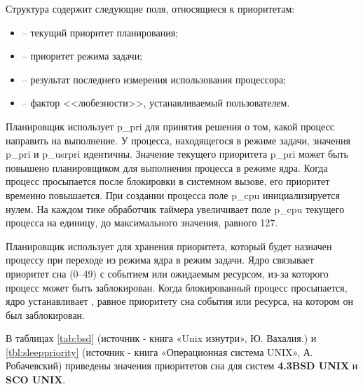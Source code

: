 Структура  содержит следующие поля, относящиеся к приоритетам:
\begin{itemize}
	\item {} -- текущий приоритет планирования;
	\item {} -- приоритет режима задачи;
	\item {} -- результат последнего измерения использования процессора;
	\item {} -- фактор <<любезности>>, устанавливаемый пользователем.
\end{itemize}

Планировщик использует p\_pri для принятия решения о том, какой процесс направить на выполнение. У процесса, находящегося в режиме задачи, значения p\_pri и p\_usrpri идентичны. Значение текущего приоритета p\_pri может быть повышено планировщиком для выполнения процесса в режиме ядра. Когда процесс просыпается после блокировки в системном вызове, его приоритет временно повышается. При создании процесса поле p\_cpu инициализируется нулем. На каждом тике обработчик таймера увеличивает поле p\_cpu текущего процесса на единицу, до максимального значения, равного 127.

Планировщик использует  для хранения приоритета, который будет назначен процессу при переходе из режима ядра в режим задачи. Ядро связывает приоритет сна (0--49) с событием или ожидаемым ресурсом, из-за которого процесс может быть заблокирован. Когда блокированный процесс просыпается, ядро устанавливает , равное приоритету сна события или ресурса, на котором он был заблокирован.

В таблицах \ref{tab:bsd} (источник - книга «Unix изнутри», Ю. Вахалия.) и \ref{tbl:sleeppriority} (источник - книга «Операционная система UNIX», А. Робачевский) приведены значения приоритетов сна для систем \textbf{4.3BSD UNIX} и \textbf{SCO UNIX}.


